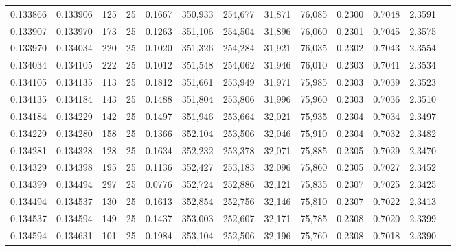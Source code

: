 \begin{tabular}{rrrrrrrrrrrrr}
0.133866 & 0.133906 &   125 &  25 &                                     0.1667 & 350,933 & 254,677 &  31,871 &  76,085 & 0.2300 & 0.7048 & 2.3591 \\
0.133907 & 0.133970 &   173 &  25 &                                     0.1263 & 351,106 & 254,504 &  31,896 &  76,060 & 0.2301 & 0.7045 & 2.3575 \\
0.133970 & 0.134034 &   220 &  25 &                                     0.1020 & 351,326 & 254,284 &  31,921 &  76,035 & 0.2302 & 0.7043 & 2.3554 \\
0.134034 & 0.134105 &   222 &  25 &                                     0.1012 & 351,548 & 254,062 &  31,946 &  76,010 & 0.2303 & 0.7041 & 2.3534 \\
0.134105 & 0.134135 &   113 &  25 &                                     0.1812 & 351,661 & 253,949 &  31,971 &  75,985 & 0.2303 & 0.7039 & 2.3523 \\
0.134135 & 0.134184 &   143 &  25 &                                     0.1488 & 351,804 & 253,806 &  31,996 &  75,960 & 0.2303 & 0.7036 & 2.3510 \\
0.134184 & 0.134229 &   142 &  25 &                                     0.1497 & 351,946 & 253,664 &  32,021 &  75,935 & 0.2304 & 0.7034 & 2.3497 \\
0.134229 & 0.134280 &   158 &  25 &                                     0.1366 & 352,104 & 253,506 &  32,046 &  75,910 & 0.2304 & 0.7032 & 2.3482 \\
0.134281 & 0.134328 &   128 &  25 &                                     0.1634 & 352,232 & 253,378 &  32,071 &  75,885 & 0.2305 & 0.7029 & 2.3470 \\
0.134329 & 0.134398 &   195 &  25 &                                     0.1136 & 352,427 & 253,183 &  32,096 &  75,860 & 0.2305 & 0.7027 & 2.3452 \\
0.134399 & 0.134494 &   297 &  25 &                                     0.0776 & 352,724 & 252,886 &  32,121 &  75,835 & 0.2307 & 0.7025 & 2.3425 \\
0.134494 & 0.134537 &   130 &  25 &                                     0.1613 & 352,854 & 252,756 &  32,146 &  75,810 & 0.2307 & 0.7022 & 2.3413 \\
0.134537 & 0.134594 &   149 &  25 &                                     0.1437 & 353,003 & 252,607 &  32,171 &  75,785 & 0.2308 & 0.7020 & 2.3399 \\
0.134594 & 0.134631 &   101 &  25 &                                     0.1984 & 353,104 & 252,506 &  32,196 &  75,760 & 0.2308 & 0.7018 & 2.3390 \\

\end{tabular}
